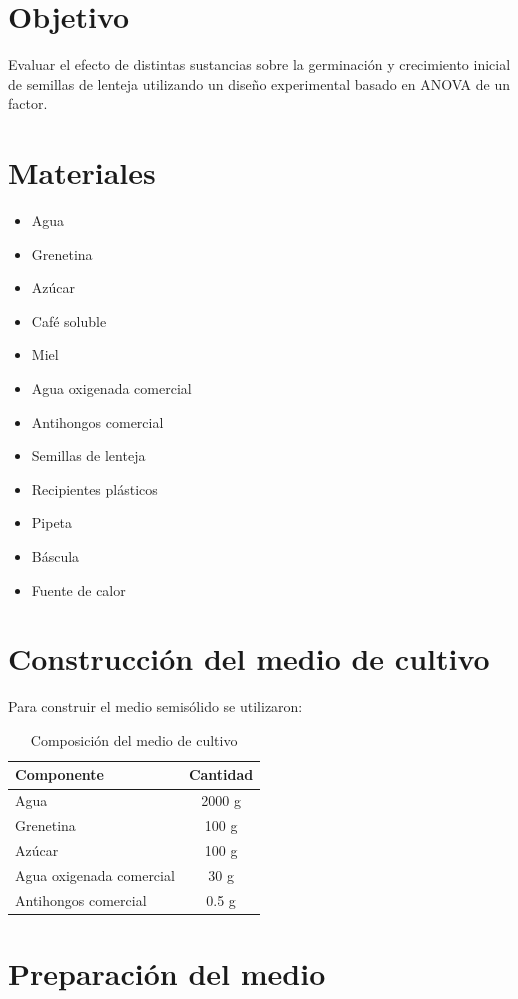 \section{Objetivo}

Evaluar el efecto de distintas sustancias sobre la germinación y crecimiento inicial de semillas de lenteja utilizando un diseño experimental basado en ANOVA de un factor.

\section{Materiales}

\begin{itemize}
\item Agua
\item Grenetina
\item Azúcar
\item Café soluble
\item Miel
\item Agua oxigenada comercial
\item Antihongos comercial
\item Semillas de lenteja
\item Recipientes plásticos
\item Pipeta
\item Báscula
\item Fuente de calor
\end{itemize}

\section{Construcción del medio de cultivo}

Para construir el medio semisólido se utilizaron:

\begin{table}[H]
\centering
\begin{tabular}{lc}
\toprule
Componente & Cantidad \\
\midrule
Agua & 2000 g \\
Grenetina & 100 g \\
Azúcar & 100 g \\
Agua oxigenada comercial & 30 g \\
Antihongos comercial & 0.5 g \\
\bottomrule
\end{tabular}
\caption{Composición del medio de cultivo}
\end{table}

\section{Preparación del medio}

